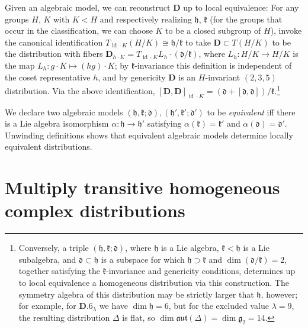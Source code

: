 \documentclass[10pt,a4paper]{amsart}
\DeclareMathOperator{\id} {id}
\newcommand{\mbD}{\mathbf{D}}
\newcommand{\mfd} {\mathfrak{d}}
\newcommand{\mfg} {\mathfrak{g}}
\newcommand{\mfh} {\mathfrak{h}}
\newcommand{\mfk} {\mathfrak{k}}
\newcommand{\mfaut}{\mathfrak{aut}}
\numberwithin{equation}{section}
\begin{document}
Given an algebraic model, we can reconstruct $\mbD$ up to local equivalence: For any groups $H$, $K$ with $K < H$ and respectively realizing $\mfh$, $\mfk$ (for the groups that occur in the classification, we can choose $K$ to be a closed subgroup of $H$), invoke the canonical identification $T_{\id \cdot K} (H / K) \cong \mfh / \mfk$ to take $\mbD \subset T(H / K)$ to be the distribution with fibers $\mbD_{h \cdot K} = T_{\id \cdot K} L_h \cdot (\mfd / \mfk)$, where $L_h \colon H / K \to H / K$ is the map $L_h \colon g \cdot K \mapsto (hg) \cdot K$; by $\mfk$-invariance this definition is independent of the coset representative $h$, and by genericity $\mbD$ is an $H$-invariant $(2, 3, 5)$ distribution. Via the above identification, $[\mbD, \mbD]_{\id \cdot K} = (\mfd + [\mfd, \mfd]) / \mfk$.\footnote{Conversely, a triple $(\mfh, \mfk; \mfd)$, where $\mfh$ is a Lie algebra, $\mfk < \mfh$ is a Lie subalgebra, and $\mfd \subset \mfh$ is a subspace for which $\mfh \supset \mfk$ and $\dim (\mfd / \mfk) = 2$, together satisfying the $\mfk$-invariance and genericity conditions, determines up to local equivalence a homogeneous distribution via this construction. The symmetry algebra of this distribution may be strictly larger that $\mfh$, however; for example, for $\mathbf{D.6}_{\lambda}$ we have $\dim \mfh = 6$, but for the excluded value $\lambda = 9$, the resulting distribution $\Delta$ is flat, so $\dim \mfaut(\Delta) = \dim \mfg_2 = 14$.}

We declare two algebraic models $(\mfh, \mfk; \mfd), (\mfh', \mfk'; \mfd')$ to be \textit{equivalent} iff there is a Lie algebra isomorphism $\alpha\colon \mfh \to \mfh'$ satisfying $\alpha(\mfk) = \mfk'$ and $\alpha(\mfd) = \mfd'$. Unwinding definitions shows that equivalent algebraic models determine locally equivalent distributions.

\section{Multiply transitive homogeneous complex distributions}\label{section:classification-complex}
\end{document}
